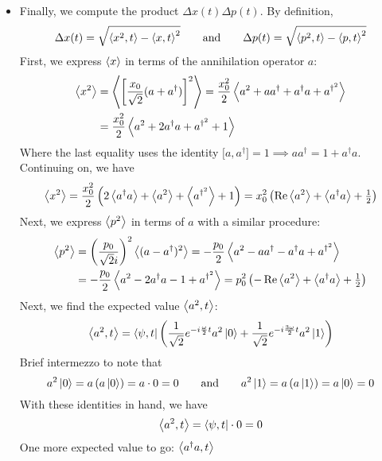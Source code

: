\documentclass[11pt, a4paper]{article}
\newcommand{\eqtext}[1]{\qquad \text{#1} \qquad}
\begin{document}
\begin{itemize}
	\item Finally, we compute the product $ \Delta x(t) \Delta p(t) $. By definition,
	\begin{equation*}
		\Delta x(t) = \sqrt{\ev{x^{2}, t} - \ev{x, t}^{2}} \eqtext{and} \Delta p(t) = \sqrt{\ev{p^{2}, t} - \ev{p, t}^{2}}
	\end{equation*}
	First, we express $ \ev{x} $ in terms of the annihilation operator $ a $:
	\begin{align*}
		\ev{x^{2}} &= \ev{\left[\frac{x_{0}}{\sqrt{2}}(a + a^{\dagger})\right]^{2}} = \frac{x_{0}^{2}}{2}\ev{a^{2} + aa^{\dagger} + a^{\dagger}a + a^{\dagger^{2}}}\\
		&= \frac{x_{0}^{2}}{2}\ev{a^{2} + 2a^{\dagger}a + a^{\dagger^{2}}+1}
	\end{align*}
	Where the last equality uses the identity $ \big[a, a^{\dagger}\big] = 1 \implies aa^{\dagger} = 1 + a^{\dagger}a $. Continuing on, we have
	\begin{equation*}
		\ev{x^{2}} = \frac{x_{0}^{2}}{2}\left(2\ev{a^{\dagger}a} + \ev{a^{2}}+ \ev{a^{\dagger^{2}}}+1\right) = x_{0}^{2}\left(\Re\ev{a^{2}} + \ev{a^{\dagger}a} + \tfrac{1}{2}\right)
	\end{equation*}
	Next, we express $ \ev{p^{2}} $ in terms of $ a $ with a similar procedure:
	\begin{align*}
		\ev{p^{2}} &= \left(\frac{p_{0}}{\sqrt{2}i}\right)^{2}\ev{(a - a^{\dagger})^{2}} = -\frac{p_{0}}{2}\ev{a^{2}- aa^{\dagger} - a^{\dagger}a + a^{\dagger^{2}}}\\
		& = -\frac{p_{0}}{2} \ev{a^{2} - 2a^{\dagger}a -1 + a^{\dagger^{2}}} = p_{0}^{2}\left(-\Re \ev{a^{2}} + \ev{a^{\dagger}a} + \tfrac{1}{2}\right)
	\end{align*}
	Next, we find the expected value $ \ev{a^{2}, t} $:
	\begin{equation*}
		\ev{a^{2}, t} = \bra{\psi, t}\left(\frac{1}{\sqrt{2}}e^{-i\frac{\omega}{2}t}a^{2}\ket{0} + \frac{1}{\sqrt{2}}e^{-i\frac{3\omega}{2}t}a^{2}\ket{1} \right) 
	\end{equation*}
	Brief intermezzo to note that
	\begin{equation*}
		a^{2}\ket{0} = a\left(a\ket{0}\right) = a \cdot 0 = 0 \eqtext{and} a^{2}\ket{1} = a\left(a\ket{1}\right) = a\ket{0} = 0
	\end{equation*}
	With these identities in hand, we have
	\begin{equation*}
		\ev{a^{2}, t} = \bra{\psi, t} \cdot 0 = 0
	\end{equation*}
	One more expected value to go: $ \ev{a^{\dagger}a, t} $

\end{itemize}
\end{document}
